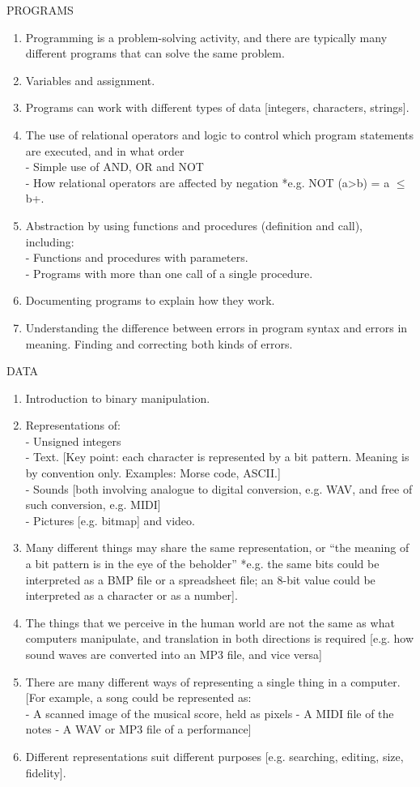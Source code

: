 PROGRAMS
\begin{enumerate}
\item Programming is a problem-solving activity, and there are typically many different
programs that can solve the same problem.
\item Variables and assignment.
\item Programs can work with different types of data [integers, characters, strings].
\item The use of relational operators and logic to control which program statements are
executed, and in what order \\
- Simple use of AND, OR and NOT\\
- How relational operators are affected by negation *e.g. NOT (a>b) = a $\leq$ b+.
\item Abstraction by using functions and procedures (definition and call), including:\\
- Functions and procedures with parameters.\\
- Programs with more than one call of a single procedure.
\item Documenting programs to explain how they work.
\item Understanding the difference between errors in program syntax and errors in
meaning. Finding and correcting both kinds of errors.
\end{enumerate}

DATA
\begin{enumerate}
\item Introduction to binary manipulation.
\item Representations of:\\
- Unsigned integers\\
- Text. [Key point: each character is represented by a bit pattern. Meaning is
by convention only. Examples: Morse code, ASCII.]\\
- Sounds [both involving analogue to digital conversion, e.g. WAV, and free of
such conversion, e.g. MIDI]\\
- Pictures [e.g. bitmap] and video.
\item Many different things may share the same representation, or “the meaning of a bit
pattern is in the eye of the beholder” *e.g. the same bits could be interpreted as a
BMP file or a spreadsheet file; an 8-bit value could be interpreted as a character or
as a number].
\item The things that we perceive in the human world are not the same as what computers
manipulate, and translation in both directions is required [e.g. how sound waves are
converted into an MP3 file, and vice versa]
\item There are many different ways of representing a single thing in a computer. [For
example, a song could be represented as:\\
- A scanned image of the musical score, held as pixels
- A MIDI file of the notes
- A WAV or MP3 file of a performance]
\item Different representations suit different purposes [e.g. searching, editing, size,
fidelity].
\end{enumerate}

